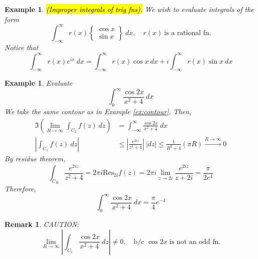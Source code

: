 \documentclass{article}
\newtheorem{example}[theorem]{Example}
\newtheorem{remark}[theorem]{Remark}
\theoremstyle{definition}
\begin{document}
\begin{example} \normalfont
    \hl{(Improper integrals of trig fns).} We wish to evaluate integrals of the form
    \begin{equation*}
        \int_{-\infty}^\infty r(x) \begin{Bmatrix} \cos x \\ \sin x \end{Bmatrix}\ dx,\quad r(x)\ \text{is a rational fn.}
    \end{equation*}
    Notice that
    \begin{equation*}
        \int_{-\infty}^\infty r(x)e^{ix}\ dx = \int_{-\infty}^\infty r(x) \cos x\ dx + i \int_{-\infty}^\infty r(x) \sin x\ dx
    \end{equation*}
\end{example}

\begin{example} \normalfont
    Evaluate
    \begin{equation*}
        \int_0^\infty \frac{\cos 2x}{x^2+4}\ dx
    \end{equation*}
    We take the same contour as in Example \ref{ex:contour}. Then,
    \begin{align*}
        \Im \left( \lim_{R \to \infty} \int_{C_2} f(z)\ dz \right) &= \int_{-\infty}^\infty \frac{\cos 2x}{x^2+4}\ dx \\
        \left| \int_{C_1} f(z)\ dz \right| &\leq \left| \frac{e^{2iz}}{z^2+4} \right|\ |dz| \leq \frac{1}{R^2+4} (\pi R) \xrightarrow{R \to \infty} 0
    \end{align*}
    By residue theorem,
    \begin{equation*}
        \int_{C_R} \frac{e^{2iz}}{z^2+4} = 2 \pi i \text{Res}_{2i} f(z) = 2 \pi i \lim_{z \to 2i} \frac{e^{2iz}}{z+2i} = \frac{\pi}{2e^4}
    \end{equation*}
    Therefore,
    \begin{equation*}
        \int_0^\infty \frac{\cos 2x}{x^2 + 4}\ dx = \frac{\pi}{4} e^{-4}
    \end{equation*}
\end{example}

\begin{remark} \normalfont
    CAUTION:
    \begin{equation*}
        \lim_{R \to \infty }\left| \int_{C_1} \frac{\cos 2x}{x^2+4}\ dz \right| \neq 0,\quad \text{b/c $\cos 2x$ is not an odd fn.}
    \end{equation*}
\end{remark}
\end{document}
